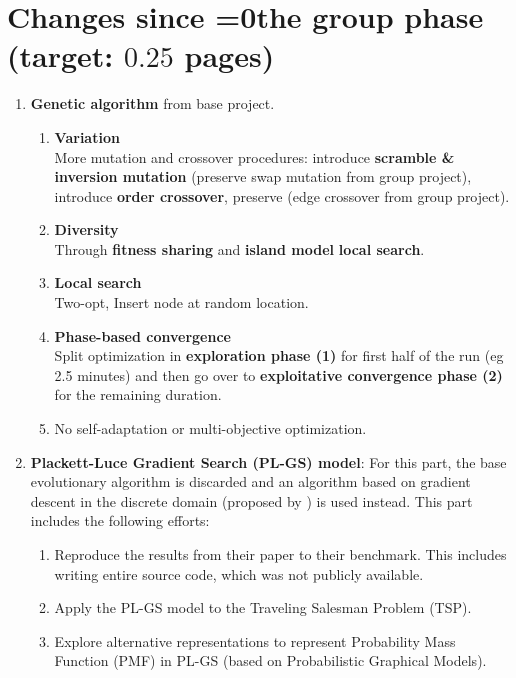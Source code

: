 \documentclass[a4paper,10pt]{article}
\def\retake{0}
\newcommand{\switch}[2]{\ifnum\retake=0{#1}\else{#2}\fi}
\newcommand{\ReplaceMe}[1]{{\color{blue}#1}}
\begin{document}
\section{Changes since \switch{the group phase}{your previous submission} (target: $0.25$ pages)}

\begin{enumerate}
	\item \textbf{Genetic algorithm} from base project.
	\begin{enumerate}
	\item \textbf{Variation} \\
			More mutation and crossover procedures: introduce \textbf{scramble \& inversion mutation} (preserve swap mutation from group project), introduce \textbf{order crossover}, preserve (edge crossover from group project).
				
	\item \textbf{Diversity} \\
			Through \textbf{fitness sharing} and \textbf{island model} \textbf{local search}.

	\item \textbf{Local search} \\
			Two-opt, Insert node at random location.
	
	\item \textbf{Phase-based convergence} \\
		Split optimization in \textbf{exploration phase (1)} for first half of the run (eg 2.5 minutes) and then go over to \textbf{exploitative convergence phase (2)} for the remaining duration.
		
	\item No self-adaptation or multi-objective optimization.
	\end{enumerate}
	
	\item \textbf{Plackett-Luce Gradient Search (PL-GS) model}: For this part, the base evolutionary algorithm is discarded and an algorithm based on gradient descent in the discrete domain (proposed by \citep{ceberiojosu_model-based_2023, santucci_gradient_2020}) is used instead. This part includes the following efforts:
		\begin{enumerate}
			\item Reproduce the results from their paper to their benchmark. This includes writing entire source code, which was not publicly available.
			\item Apply the PL-GS model to the Traveling Salesman Problem (TSP).
			\item Explore alternative representations to represent Probability Mass Function (PMF) in PL-GS (based on Probabilistic Graphical Models).
		\end{enumerate}
	
\end{enumerate}
\end{document}
